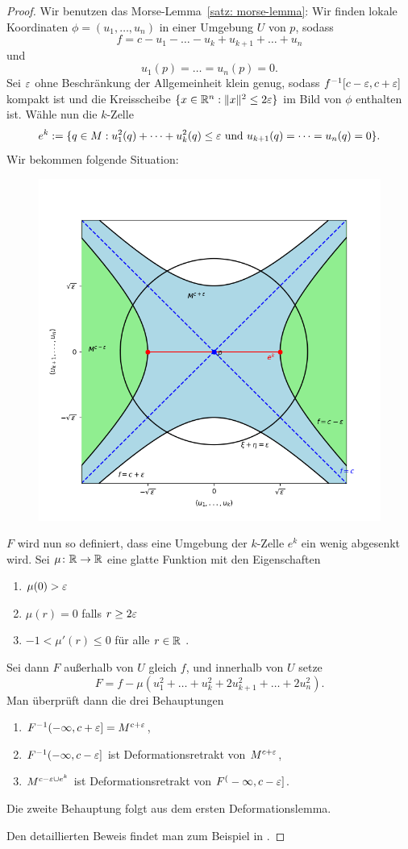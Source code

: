 \begin{proof}
    Wir benutzen das Morse-Lemma~\ref{satz: morse-lemma}:
    Wir finden lokale Koordinaten $\phi = (u_1, \dots, u_n)$ in einer Umgebung $U$ von $p$, sodass 
    \[ f = c - u_1 - \dots - u_k + u_{k + 1} + \dots + u_n \]
    und
    \[ u_1 (p) = \dots = u_n(p) = 0 . \]
    Sei $\varepsilon$ ohne Beschränkung der Allgemeinheit klein genug, sodass $f^{-1}[c - \varepsilon, c + \varepsilon]$ 
    kompakt ist und die Kreisscheibe $\{ x \in { \mathbb R }^n : \| x \|^2 \leq 2 \varepsilon \}$ im Bild von $\phi$ 
    enthalten ist. Wähle nun die $k$-Zelle 
    \[ e^k := \{ q \in M : u_1^2 (q) + \dots + u_k^2 (q) \leq \varepsilon \text{ und }
        u_{k + 1} (q) = \dots = u_n (q) = 0 \} . \]
    Wir bekommen folgende Situation:
    \begin{figure}[H]
        \centering
        \includegraphics[width=0.45\linewidth]{../resources/Me-Diagram6-U-parameterized.png}
        \label{fig:me-diagram6}
    \end{figure}
    $F$ wird nun so definiert, dass eine Umgebung der $k$-Zelle $e^k$ ein wenig abgesenkt wird.
    Sei $\mu \colon { \mathbb R } \to { \mathbb R }$ eine glatte Funktion mit den Eigenschaften
    \begin{enumerate}
        \item $\mu(0) > \varepsilon$
        \item $\mu (r) = 0$ falls $r \geq 2 \varepsilon$
        \item $-1 < \mu' (r) \leq 0$ für alle $r \in { \mathbb R }$ .
    \end{enumerate}
    Sei dann $F$ außerhalb von $U$ gleich $f$, und innerhalb von $U$ setze
    \[ F = f - \mu ( u_1^2 + \dots + u_k^2 + 2 u_{k + 1}^2 + \dots + 2 u_n^2) . \]
    Man überprüft dann die drei Behauptungen
    \begin{enumerate}
        \item $F^{-1}(- \infty, c + \varepsilon] = M^{c + \varepsilon}$,
        \item $F^{-1}(- \infty, c - \varepsilon]$ ist Deformationsretrakt von $M^{c + \varepsilon}$,
        \item $M^{c - \varepsilon \cup e^k}$ ist Deformationsretrakt von $F^(- \infty, c - \varepsilon]$.
    \end{enumerate}
    Die zweite Behauptung folgt aus dem ersten Deformationslemma.
    
    Den detaillierten Beweis findet man zum Beispiel in \cite{milnor}.
\end{proof}

